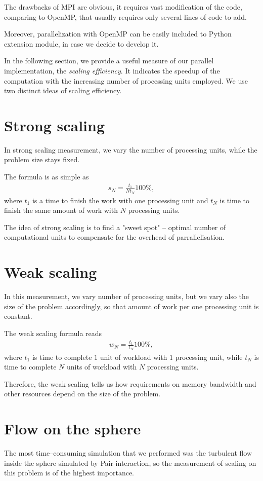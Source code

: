 The drawbacks of MPI are obvious, it requires vast modification of the code, comparing to OpenMP, that usually requires only several lines of code to add.

Moreover, parallelization with OpenMP can be easily included to Python extension module, in case we decide to develop it.

In the following section, we provide a useful measure of our parallel implementation, the \textit{scaling efficiency}. It indicates the speedup of the computation with the increasing number of processing units employed.
We use two distinct ideas of scaling efficiency.

\section{Strong scaling}
In strong scaling measurement, we vary the number of processing units, while the problem size stays fixed.

The formula is as simple as
\begin{align*}
s_N = \frac{t_1}{N t_N} 100\%,
\end{align*}
where $t_1$ is a time to finish the work with one processing unit and $t_N$ is time to finish the same amount of work with $N$ processing units.

The idea of strong scaling is to find a "sweet spot" -- optimal number of computational units to compensate for the overhead of parrallelisation.
\section{Weak scaling}
In this measurement, we vary number of processing units, but we vary also the size of the problem accordingly, so that amount of work per one processing unit is constant.

The weak scaling formula reads
\begin{align*}
w_N = \frac{t_1}{t_N} 100\%,
\end{align*}
where $t_1$ is time to complete $1$ unit of workload with $1$ processing unit, while $t_N$ is time to complete $N$ units of workload with $N$ processing units.

Therefore, the weak scaling tells us how requirements on memory bandwidth and other resources depend on the size of the problem.

\section{Flow on the sphere}
The most time--consuming simulation that we performed was the turbulent flow inside the sphere simulated by Pair-interaction, so the measurement of scaling on this problem is of the highest importance.

